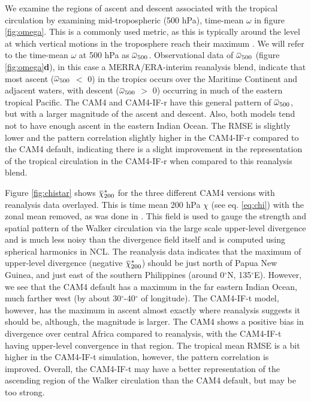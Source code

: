\documentclass[letterpaper,12pt,titlepage,oneside,final]{book}
\newcommand{\overbar}[1]{\mkern 1.5mu\overline{\mkern-1.5mu#1\mkern-1.5mu}\mkern 1.5mu}
\begin{document}
We examine the regions of ascent and descent associated with the tropical circulation by examining mid-tropospheric (500 hPa), time-mean $\omega$  in figure \ref{fig:omega}. This is a commonly used metric, as this is typically around the level at which vertical motions in the troposphere reach their maximum \citep{vecchi_global_2007}. We will refer to the time-mean $\omega$ at 500 hPa as $\overbar{\omega}_{500}$.
Observational data of $\overbar{\omega}_{500}$ (figure \ref{fig:omega}\textbf{d}), in this case a MERRA/ERA-interim reanalysis blend, indicate that most ascent ($\overbar{\omega}_{500}$ $<$ 0) in the tropics occurs over the Maritime Continent and adjacent waters, with descent ($\overbar{\omega}_{500}$ $>$ 0) occurring in much of the eastern tropical Pacific. The CAM4 and CAM4-IF-r have this general pattern of $\overbar{\omega}_{500}$, but with a larger magnitude of the ascent and descent. Also, both models tend not to have enough ascent in the eastern Indian Ocean. The RMSE is slightly lower and the pattern correlation slightly higher in the CAM4-IF-r compared to the CAM4 default, indicating there is a slight improvement in the representation of the tropical circulation in the CAM4-IF-r when compared to this reanalysis blend.

Figure \ref{fig:chistar} shows $\overbar{\chi}^{*}_{200}$ for the three different CAM4 versions with reanalysis data overlayed. This is time mean 200 hPa $\chi$ (see eq. \ref{eq:chi}) with the zonal mean removed, as was done in \cite{tanaka_trend_2004}. This field is used to gauge the strength and spatial pattern of the Walker circulation via the large scale upper-level divergence and is much less noisy than the divergence field itself and is computed using spherical harmonics in NCL. The reanalysis data indicates that the maximum of upper-level divergence (negative $\overbar{\chi}^{*}_{200}$) should be just north of Papua New Guinea, and just east of the southern Philippines (around 0$^{\circ}$N, 135$^{\circ}$E). However, we see that the CAM4 default has a maximum in the far eastern Indian Ocean, much farther west (by about 30$^{\circ}$-40$^{\circ}$ of longitude). The CAM4-IF-t model, however, has the maximum in ascent almost exactly where reanalysis suggests it should be, although, the magnitude is larger. The CAM4 shows a positive bias in divergence over central Africa compared to reanalysis, with the CAM4-IF-t having upper-level convergence in that region. The tropical mean RMSE is a bit higher in the CAM4-IF-t simulation, however, the pattern correlation is improved. Overall, the CAM4-IF-t may have a better representation of the ascending region of the Walker circulation than the CAM4 default, but may be too strong.
\end{document}
